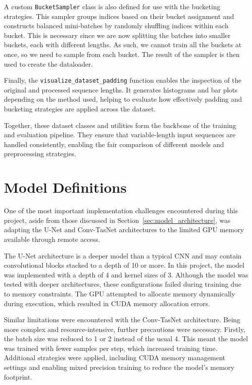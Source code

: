 A custom \texttt{BucketSampler} class is also defined for use with the bucketing strategies. This sampler groups indices based on their bucket assignment and constructs balanced mini-batches by randomly shuffling indices within each bucket. This is necessary since we are now splitting the batches into smaller buckets, each with different lengths. As such, we cannot train all the buckets at once, so we need to sample from each bucket. The result of the sampler is then used to create the dataloader.

Finally, the \texttt{visualize\_dataset\_padding} function enables the inspection of the original and processed sequence lengths. It generates histograms and bar plots depending on the method used, helping to evaluate how effectively padding and bucketing strategies are applied across the dataset.

Together, these dataset classes and utilities form the backbone of the training and evaluation pipeline. They ensure that variable-length input sequences are handled consistently, enabling the fair comparison of different models and preprocessing strategies.

\section{Model Definitions}
\label{sec:model_definitions}

One of the most important implementation challenges encountered during this project, aside from those discussed in Section~\ref{sec:model_architecture}, was adapting the U-Net and Conv-TasNet architectures to the limited GPU memory available through remote access.

The U-Net architecture is a deeper model than a typical CNN and may contain convolutional blocks stacked to a depth of 10 or more. In this project, the model was implemented with a depth of 4 and kernel sizes of 3. Although the model was tested with deeper architectures, these configurations failed during training due to memory constraints. The GPU attempted to allocate memory dynamically during execution, which resulted in CUDA memory allocation errors.

Similar limitations were encountered with the Conv-TasNet architecture. Being more complex and resource-intensive, further precautions were necessary. Firstly, the batch size was reduced to 1 or 2 instead of the usual 4. This meant the model was trained with fewer samples per step, which increased training time. Additional strategies were applied, including CUDA memory management settings and enabling mixed precision training to reduce the model's memory footprint.


